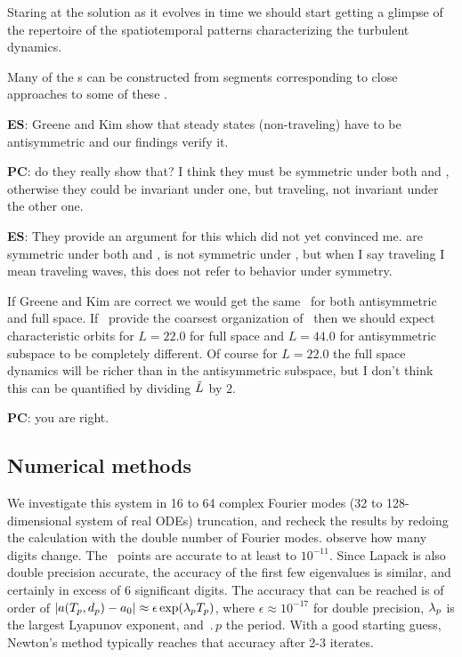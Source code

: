 Staring at the solution
 as it evolves in time we should start getting a glimpse of the
 repertoire of the spatiotemporal patterns characterizing
 the turbulent dynamics.

Many of the \rpo s can be constructed from segments corresponding to
close approaches to some of these \eqva.

\textbf{ES}: Greene and Kim show that steady states (non-traveling)
have to be antisymmetric and our findings verify it.

\textbf{PC}: do they really show that? I think they must be symmetric under both
{\Refl} and \Shift, otherwise they could be invariant under one,
but traveling, not invariant under the other one.

\textbf{ES}: They provide an argument for this which did not yet convinced me.
 are symmetric under both {\Refl} and \Shift,  is not
symmetric under \Shift, but when I say traveling I mean traveling waves,
this does not refer to behavior under symmetry.

If Greene and Kim
are correct we would get the same \eqva\ for both
antisymmetric and full space. If \eqva\ provide the coarsest organization
of \statesp\ then we should expect characteristic orbits for $L=22.0$
for full space and $L=44.0$ for antisymmetric subspace to be completely different.
Of course for $L=22.0$ the full space dynamics will be richer than
in the
antisymmetric subspace, but I don't think this can be quantified by
dividing $\tilde{L}$ by $2$.

\textbf{PC}: you are right.


\subsection{Numerical methods}

 We investigate this system in 16 to 64 complex Fourier modes (32 to
128-dimensional system of real ODEs) truncation, and recheck the results
by redoing the calculation with the double number of Fourier modes. %
observe how many digits change. The \eqv\ points are accurate to at least
to $10^{-11}$. Since Lapack is also double precision accurate, the
accuracy of the first few eigenvalues is similar, and certainly in excess
of 6 significant digits. %
The accuracy that can be reached is of order of
$|a({T_{p}},d_p) - a_0|
 \approx \epsilon \exp(\lambda_p {T_{p}})$,
 where $\epsilon \approx 10^{-17}$ for double precision, $\lambda_p$ is
the largest Lyapunov exponent, and $\period{p}$ the period.  With a good
starting guess, Newton's method typically reaches that accuracy after 2-3
iterates.




